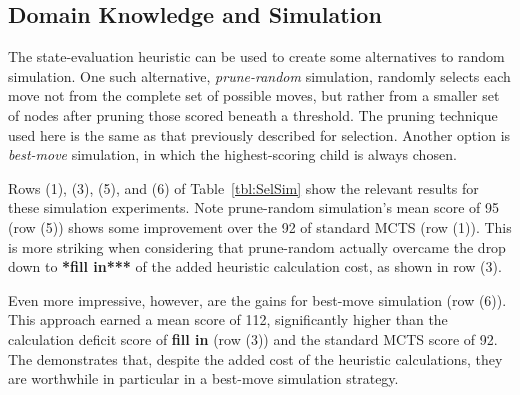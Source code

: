 \documentclass[letterpaper]{article}
\begin{document}
\subsection{Domain Knowledge and Simulation}


The state-evaluation heuristic can be used to create some alternatives to random simulation. One such alternative, {\it prune-random} simulation, randomly selects each move not from the complete set of possible moves, but rather from a smaller set of nodes after pruning those scored beneath a threshold. The pruning technique used here is the same as that previously described for selection. Another option is {\it best-move} simulation, in which the highest-scoring child is always chosen.

Rows (1), (3), (5), and (6) of Table~\ref{tbl:SelSim} show the relevant results for these simulation experiments. Note prune-random simulation's mean score of 95 (row (5)) shows some improvement over the 92 of standard MCTS (row (1)). This is more striking when considering that prune-random actually overcame the drop down to {\bf **fill in***} of the added heuristic calculation cost, as shown in row (3).

Even more impressive, however, are the gains for best-move simulation (row (6)). This approach earned a mean score of 112, significantly higher than the calculation deficit score of {\bf fill in} (row (3)) and the standard MCTS score of 92. The demonstrates that, despite the added cost of the heuristic calculations, they are worthwhile in particular in a best-move simulation strategy.

\end{document}
